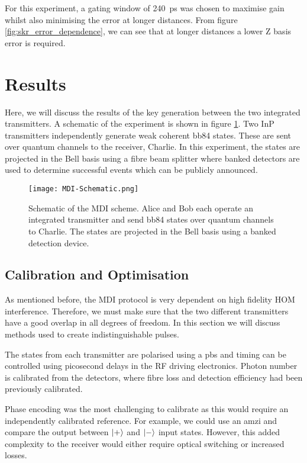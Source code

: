 For this experiment, a gating window of \SI{240}{\ps} was chosen to maximise gain whilst also minimising the error at longer distances. From figure \ref{fig:skr_error_dependence}, we can see that at longer distances a lower Z basis error is required.

\section{Results}

Here, we will discuss the results of the key generation between the two integrated transmitters. A schematic of the experiment is shown in figure \ref{fig:mdi-schem}. Two \ac{InP} transmitters independently generate weak coherent \ac{bb84} states. These are sent over quantum channels to the receiver, Charlie. In this experiment, the states are projected in the Bell basis using a fibre beam splitter where banked detectors are used to determine successful events which can be publicly announced. 

\begin{figure}[t]
	\centering
	\texttt{[image: MDI-Schematic.png]}
	\caption[Chip-based MDI-QKD experimental schematic]{Schematic of the \acs{MDI} scheme. Alice and Bob each operate an integrated transmitter and send \acs{bb84} states over quantum channels to Charlie. The states are projected in the Bell basis using a banked detection device.}
	\label{fig:mdi-schem}
\end{figure}

\subsection{Calibration and Optimisation}

As mentioned before, the \ac{MDI} protocol is very dependent on high fidelity \ac{HOM} interference. Therefore, we must make sure that the two different transmitters have a good overlap in all degrees of freedom. In this section we will discuss methods used to create indistinguishable pulses.

The states from each transmitter are polarised using a \ac{pbs} and timing can be controlled using picosecond delays in the RF driving electronics. Photon number is calibrated from the detectors, where fibre loss and detection efficiency had been previously calibrated. 

Phase encoding was the most challenging to calibrate as this would require an independently calibrated reference. For example, we could use an \ac{amzi} and compare the output between $\ket{+}$ and $\ket{-}$ input states. However, this added complexity to the receiver would either require optical switching or increased losses. 


